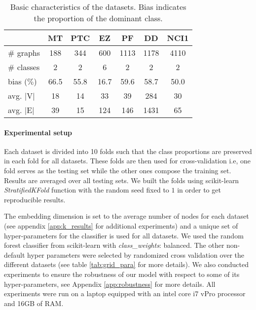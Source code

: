 \documentclass{article}
\begin{document}
\begin{table}
    \centering
    \renewcommand{\arraystretch}{1.2}
    \begin{tabular}[t]{l|cccccc}
    
                          & MT    & PTC   & EZ    & PF    & DD    & NCI1  \\
        \hline
        $\#$ graphs       & 188   & 344   & 600   & 1113  & 1178  & 4110  \\
        $\#$ classes      & 2     & 2     & 6     & 2     & 2     & 2     \\
        bias ($\%$)       & 66.5  & 55.8  & 16.7  & 59.6  & 58.7  & 50.0  \\
        avg. |V|          & 18    & 14    & 33    & 39    & 284   & 30  \\
        avg. |E|          & 39    & 15    & 124   & 146   & 1431  & 65  \\
    
    \end{tabular}
    \vspace{0.5cm}
    \caption{Basic characteristics of the datasets. Bias indicates the proportion of the dominant class.}
    \label{tab:datasets}
\end{table}


\paragraph{Experimental setup}
\label{para:experimental_setup}
Each dataset is divided into 10 folds such that the class proportions are preserved in each fold for all datasets. These folds are then used for cross-validation i.e, one fold serves as the testing set while the other ones compose the training set. Results are averaged over all testing sets. We built the folds using scikit-learn \cite{pedregosa2011scikit} \textit{StratifiedKFold} function with the random seed fixed to $1$ in order to get reproducible results.


The embedding dimension is set to the average number of nodes for each dataset (see appendix \ref{app:k_results} for additional experiments) and a unique set of hyper-parameters for the classifier is used for all datasets. We used the random forest classifier from scikit-learn with \textit{class\_weights}: balanced. The other non-default hyper parameters were selected by randomized cross validation over the different datasets (see table \ref{tab:grid_para} for more details). We also conducted experiments to ensure the robustness of our model with respect to some of its hyper-parameters, see Appendix \ref{app:robustness} for more details. All experiments were run on a laptop equipped with an intel core i7 vPro processor and 16GB of RAM.
\end{document}
